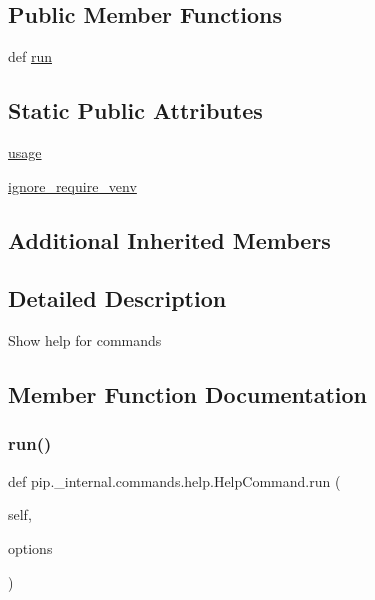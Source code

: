 \subsection*{Public Member Functions}
\begin{DoxyCompactItemize}
\item 
def \hyperlink{classpip_1_1__internal_1_1commands_1_1help_1_1HelpCommand_ae018adab14c43ab23df916cad4451a6a}{run}
\end{DoxyCompactItemize}
\subsection*{Static Public Attributes}
\begin{DoxyCompactItemize}
\item 
\hyperlink{classpip_1_1__internal_1_1commands_1_1help_1_1HelpCommand_ae8801a73f67f9bb4a87fbab3b2915d40}{usage}
\item 
\hyperlink{classpip_1_1__internal_1_1commands_1_1help_1_1HelpCommand_a133aa91b539e73d5bbce82534d8e5578}{ignore\+\_\+require\+\_\+venv}
\end{DoxyCompactItemize}
\subsection*{Additional Inherited Members}


\subsection{Detailed Description}
\begin{DoxyVerb}Show help for commands\end{DoxyVerb}
 

\subsection{Member Function Documentation}
\mbox{\label{classpip_1_1__internal_1_1commands_1_1help_1_1HelpCommand_ae018adab14c43ab23df916cad4451a6a}} 
\subsubsection{\texorpdfstring{run()}{run()}}
{\footnotesize\ttfamily def pip.\+\_\+internal.\+commands.\+help.\+Help\+Command.\+run (\begin{DoxyParamCaption}\item[{}]{self,  }\item[{}]{options }\end{DoxyParamCaption})}



